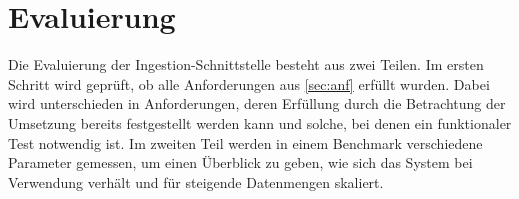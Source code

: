 \chapter{Evaluierung}

Die Evaluierung der Ingestion-Schnittstelle besteht aus zwei Teilen.
Im ersten Schritt wird geprüft, ob alle Anforderungen aus \cref{sec:anf} erfüllt wurden.
Dabei wird unterschieden in Anforderungen, deren Erfüllung durch die Betrachtung der Umsetzung bereits festgestellt werden kann und solche, bei denen ein funktionaler Test notwendig ist.
Im zweiten Teil werden in einem Benchmark verschiedene Parameter gemessen, um einen Überblick zu geben, wie sich das System bei Verwendung verhält und für steigende Datenmengen skaliert.


